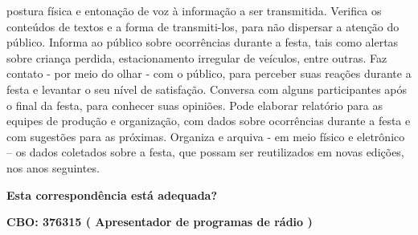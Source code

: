 \documentclass[
]{article}
\begin{document}
postura física e entonação de voz à informação a ser transmitida.
Verifica os conteúdos de textos e a forma de transmiti-los, para não
dispersar a atenção do público. Informa ao público sobre ocorrências
durante a festa, tais como alertas sobre criança perdida, estacionamento
irregular de veículos, entre outras. Faz contato - por meio do olhar -
com o público, para perceber suas reações durante a festa e levantar o
seu nível de satisfação. Conversa com alguns participantes após o final
da festa, para conhecer suas opiniões. Pode elaborar relatório para as
equipes de produção e organização, com dados sobre ocorrências durante a
festa e com sugestões para as próximas. Organiza e arquiva - em meio
físico e eletrônico -- os dados coletados sobre a festa, que possam ser
reutilizados em novas edições, nos anos seguintes.

\begin{Form}
\textbf{Esta correspondência está adequada?} \\ 
\end{Form}

\textbf{CBO: 376315  ( Apresentador de programas de rádio )}
\end{document}
